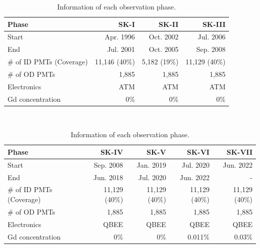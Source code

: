\begin{table}[h]
	\caption[Information of each observation phase]{\label{SK_Tab:phase} Information of each observation phase.}
	\centering
	\vs
	\begin{tabular}{lrrr}
		\hline\hline
		Phase&SK-I&SK-II&SK-III\\
		\hline
		Start&Apr. 1996&Oct. 2002&Jul. 2006\\
		End&Jul. 2001&Oct. 2005&Sep. 2008\\
		\# of ID PMTs (Coverage)&11,146 (40\%)&5,182 (19\%)&11,129 (40\%)\\
		\# of OD PMTs&1,885&1,885&1,885\\
		Electronics&ATM&ATM&ATM\\
		Gd concentration&0\%&0\%&0\%\\
		\hline\hline
	\end{tabular}
	\\
	\vs
	\begin{tabular}{lrrrr}
		\hline\hline
		Phase&SK-IV&SK-V&SK-VI&SK-VII\\
		\hline
		Start&Sep. 2008&Jan. 2019&Jul. 2020&Jun. 2022\\
		End&Jun. 2018&Jul. 2020&Jun. 2022&-\\
		\# of ID PMTs (Coverage)&11,129 (40\%)&11,129 (40\%)&11,129 (40\%)&11,129 (40\%)\\
		\# of OD PMTs&1,885&1,885&1,885&1,885\\
		Electronics&QBEE&QBEE&QBEE&QBEE\\
		Gd concentration&0\%&0\%&0.011\%&0.03\%\\
		\hline\hline
	\end{tabular}
\end{table}

